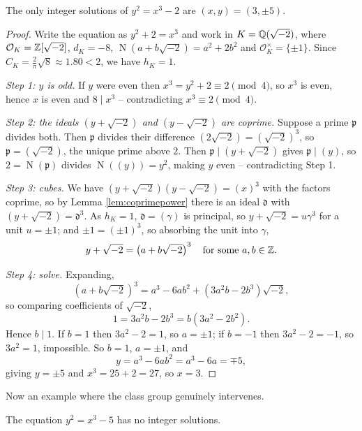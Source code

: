\documentclass[a4paper]{scrartcl}
\renewcommand{\OO}{\mathcal{O}}
\newcommand{\Nm}{\operatorname{N}}
\newcommand{\fd}{\mathfrak{d}}
\newcommand{\fp}{\mathfrak{p}}
\begin{document}
\begin{theorem}\label{thm:mordell2}
	The only integer solutions of $y^2 = x^3 - 2$ are $(x,y) = (3,\pm5)$.
\end{theorem}

\begin{proof}
	Write the equation as $y^2 + 2 = x^3$ and work in $K = \mathbb{Q}(\sqrt{-2})$, where $\OO_K = \Z[\sqrt{-2}]$, $d_K = -8$, $\Nm(a+b\sqrt{-2}) = a^2+2b^2$ and $\OO_K^\times = \{\pm1\}$. Since $C_K = \tfrac2\pi\sqrt8 \approx 1.80 < 2$, we have $h_K = 1$.

	\emph{Step 1: $y$ is odd.} If $y$ were even then $x^3 = y^2+2 \equiv 2 \pmod 4$, so $x^3$ is even, hence $x$ is even and $8 \mid x^3$ -- contradicting $x^3 \equiv 2\pmod4$.

	\emph{Step 2: the ideals $(y+\sqrt{-2})$ and $(y-\sqrt{-2})$ are coprime.} Suppose a prime $\fp$ divides both. Then $\fp$ divides their difference $(2\sqrt{-2}) = (\sqrt{-2})^3$, so $\fp = (\sqrt{-2})$, the unique prime above $2$. Then $\fp \mid (y+\sqrt{-2})$ gives $\fp \mid (y)$, so $2 = \Nm(\fp)$ divides $\Nm((y)) = y^2$, making $y$ even -- contradicting Step 1.

	\emph{Step 3: cubes.} We have $(y+\sqrt{-2})(y-\sqrt{-2}) = (x)^3$ with the factors coprime, so by Lemma \ref{lem:coprimepower} there is an ideal $\fd$ with $(y+\sqrt{-2}) = \fd^3$. As $h_K = 1$, $\fd = (\gamma)$ is principal, so $y+\sqrt{-2} = u\gamma^3$ for a unit $u = \pm1$; and $\pm1 = (\pm1)^3$, so absorbing the unit into $\gamma$,
	$$y+\sqrt{-2} = \left(a+b\sqrt{-2}\right)^3 \quad\text{for some } a, b \in \mathbb{Z}.$$

	\emph{Step 4: solve.} Expanding,
	$$\left(a+b\sqrt{-2}\right)^3 = a^3 - 6ab^2 + \left(3a^2b - 2b^3\right)\sqrt{-2},$$
	so comparing coefficients of $\sqrt{-2}$,
	$$1 = 3a^2b - 2b^3 = b\left(3a^2-2b^2\right).$$
	Hence $b \mid 1$. If $b = 1$ then $3a^2-2 = 1$, so $a = \pm1$; if $b = -1$ then $3a^2-2 = -1$, so $3a^2 = 1$, impossible. So $b = 1$, $a = \pm1$, and
	$$y = a^3-6ab^2 = a^3 - 6a = \mp 5,$$
	giving $y = \pm5$ and $x^3 = 25+2 = 27$, so $x = 3$.
\end{proof}

Now an example where the class group genuinely intervenes.

\begin{theorem}\label{thm:mordell5}
	The equation $y^2 = x^3-5$ has no integer solutions.
\end{theorem}
\end{document}
